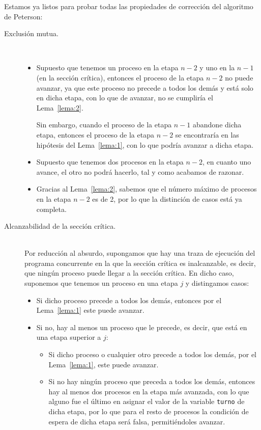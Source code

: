 Estamos ya listos para probar todas las propiedades de corrección del algoritmo de Peterson:
\begin{description}
    \item [Exclusión mutua.]\ 
        \begin{itemize}
            \item Supuesto que tenemos un proceso en la etapa $n-2$ y uno en la $n-1$ (en la sección crítica), entonces el proceso de la etapa $n-2$ no puede avanzar, ya que este proceso no precede a todos los demás y está solo en dicha etapa, con lo que de avanzar, no se cumpliría el Lema~\ref{lema:2}.

                Sin embargo, cuando el proceso de la etapa $n-1$ abandone dicha etapa, entonces el proceso de la etapa $n-2$ se encontraría en las hipótesis del Lema~\ref{lema:1}, con lo que podría avanzar a dicha etapa.
            \item Supuesto que tenemos dos procesos en la etapa $n-2$, en cuanto uno avance, el otro no podrá hacerlo, tal y como acabamos de razonar.
            \item Gracias al Lema~\ref{lema:2}, sabemos que el número máximo de procesos en la etapa $n-2$ es de 2, por lo que la distinción de casos está ya completa.
        \end{itemize}
    \item [Alcanzabilidad de la sección crítica.]~\\
        Por reducción al absurdo, supongamos que hay una traza de ejecución del programa concurrente en la que la sección crítica es inalcanzable, es decir, que ningún proceso puede llegar a la sección crítica. En dicho caso, suponemos que tenemos un proceso en una etapa $j$ y distingamos casos:
        \begin{itemize}
            \item Si dicho proceso precede a todos los demás, entonces por el Lema~\ref{lema:1} este puede avanzar.
            \item Si no, hay al menos un proceso que le precede, es decir, que está en una etapa superior a $j$:
                \begin{itemize}
                    \item Si dicho proceso o cualquier otro precede a todos los demás, por el Lema~\ref{lema:1}, este puede avanzar.
                    \item Si no hay ningún proceso que preceda a todos los demás, entonces hay al menos dos procesos en la etapa más avanzada, con lo que alguno fue el último en asignar el valor de la variable \verb|turno| de dicha etapa, por lo que para el resto de procesos la condición de espera de dicha etapa será falsa, permitiéndoles avanzar.

\end{itemize}
\end{itemize}
\end{description}
